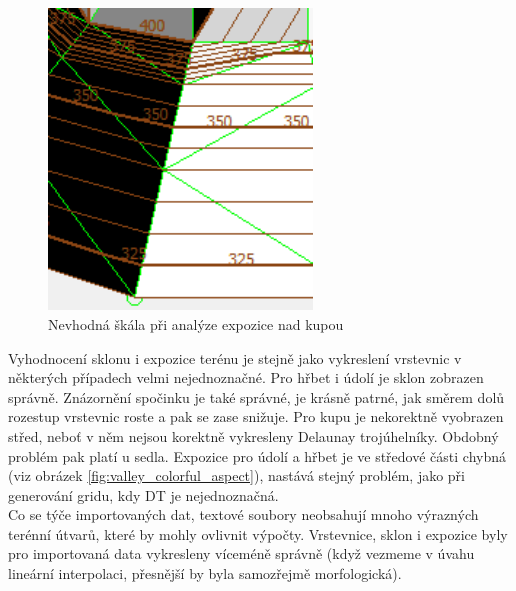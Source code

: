 \documentclass[a4paper,11pt,twoside]{article}
\begin{document}
\vspace{0.2cm}
\begin{figure}[hbt!] 
\begin{center}
\includegraphics[width=7cm]{pictures/hill_panchromatic_aspect_detail.PNG} 
\caption[Nevhodná škála při analýze expozice nad kupou]{Nevhodná škála při analýze expozice nad kupou}
\label{fig:hill_panchromatic_aspect_detail}
\end{center}
\end{figure}

\indent Vyhodnocení sklonu i expozice terénu je stejně jako vykreslení vrstevnic v některých případech velmi nejednoznačné. Pro hřbet i údolí je sklon zobrazen správně. Znázornění spočinku je také správné, je krásně patrné, jak směrem dolů rozestup vrstevnic roste a pak se zase snižuje. Pro kupu je nekorektně vyobrazen střed, neboť v něm nejsou korektně vykresleny Delaunay trojúhelníky. Obdobný problém pak platí u sedla. Expozice pro údolí a hřbet je ve středové části chybná (viz obrázek \ref{fig:valley_colorful_aspect}), nastává stejný problém, jako při generování gridu, kdy DT je nejednoznačná. \\
Co se týče importovaných dat, textové soubory neobsahují mnoho výrazných terénní útvarů, které by mohly ovlivnit výpočty. Vrstevnice, sklon i expozice byly pro importovaná data vykresleny víceméně správně (když vezmeme v úvahu lineární interpolaci, přesnější by byla samozřejmě morfologická). 

\newpage
\vspace*{-1cm}
\end{document}
